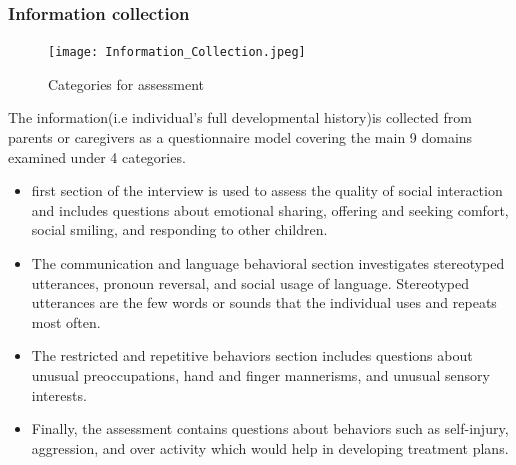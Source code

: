\subsubsection{Information collection}
\begin{figure}[h]
\label{ss}
\centering
\texttt{[image: Information\_Collection.jpeg]}
\caption{Categories for assessment}
\end{figure}
The information(i.e  individual's full developmental history)is collected from parents or caregivers as a questionnaire model covering the main 9 domains examined under 4 categories.\\
\begin{itemize}
  \item first section of the interview is used to assess the quality of social interaction and includes questions about emotional sharing, offering and seeking comfort, social smiling, and responding to other children.
  \item  The communication and language behavioral section investigates stereotyped utterances, pronoun reversal, and social usage of language. Stereotyped utterances are the few words or sounds that the individual uses and repeats most often.
  \item The restricted and repetitive behaviors section includes questions about unusual preoccupations, hand and finger mannerisms, and unusual sensory interests.
  \item Finally, the assessment contains questions about behaviors such as self-injury, aggression, and over activity which would help in developing treatment plans.
  \end{itemize}


